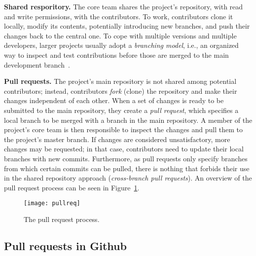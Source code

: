 \documentclass{sig-alternate}
\begin{document}
\textbf{Shared resporitory.}
    The core team shares the project's repository, with read and write
    permissions, with the contributors. To work, contributors clone it locally,
    modify its contents, potentially introducing new branches, and push their
    changes back to the central one. To cope with multiple versions and multiple
    developers, larger projects usually adopt a {\em branching model}, i.e., an
    organized way to inspect and test contributions before those are merged to
    the main development branch~\cite{Bird12}. 
    

\textbf{Pull requests.}
    The project's main repository is not shared among potential contributors;
    instead, contributors \emph{fork} (clone) the repository and make their
    changes independent of each other. When a set of changes is ready to be
    submitted to the main repository, they create a \emph{pull request}, which
    specifies a local branch to be merged with a branch in the main
    repository. A member of the project's core team is then responsible to
    inspect the changes and pull them to the project's master branch. If changes
    are considered unsatisfactory, more changes may be requested; in that case,
    contributors need to update their local branches with new commits.
    Furthermore, as pull requests only specify branches from which certain
    commits can be pulled, there is nothing that forbids their use in the shared
    repository approach (\emph{cross-branch pull requests}). An overview of the
    pull request process can be seen in Figure~\ref{fig:pullreq-process}.

    \begin{figure}[t]
      \begin{center}
        \texttt{[image: pullreq]}
      \end{center}
      \caption{The pull request process.}
      \label{fig:pullreq-process}
    \end{figure}

\subsection{Pull requests in Github}
\end{document}
